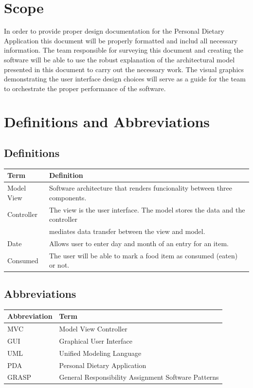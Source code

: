 \documentclass{scrreprt}
\begin{document}
\section{Scope}
In order to provide proper design documentation for the Personal Dietary Application this document will be properly formatted and includ all necessary information. The team responsible for surveying this document and creating the software will be able to use the robust explanation of the architectural model presented in this document to carry out the necessary work. The visual graphics demonstrating the user interface design choices will serve as a guide for the team to orchestrate the proper performance of the software.
\section{Definitions and Abbreviations}
\subsection{Definitions}
\begin{tabular}{|l|l|}
\hline
	Term & Definition \\
\hline
	Model View & Software architecture that renders funcionality between three components. \\
	Controller & The view is the user interface. The model stores the data and the controller \\
	& mediates data transfer between the view and model. \\
\hline
	Date & Allows user to enter day and month of an entry for an item. \\
\hline
	Consumed & The user will be able to mark a food item as consumed (eaten) or not. \\
\hline
\end{tabular}

\subsection{Abbreviations}
\begin{tabular}{|l|l|}
\hline
	Abbreviation & Term \\
\hline
	MVC & Model View Controller \\
\hline
	GUI & Graphical User Interface \\
\hline
	UML & Unified Modeling Language \\
\hline
	PDA & Personal Dietary Application \\
\hline
	GRASP & General Responsibility Assignment Software Patterns \\
\hline
\end{tabular}
\end{document}
